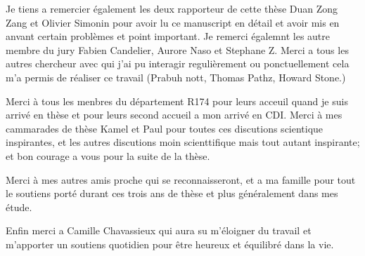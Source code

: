 Je tiens a remercier également les deux rapporteur de cette thèse Duan Zong Zang et Olivier Simonin pour avoir lu ce manuscript en détail et avoir mis en anvant certain problèmes et point important. 
Je remerci égalemnt les autre membre du jury Fabien Candelier, Aurore Naso et Stephane Z. 
Merci a tous les autres chercheur avec qui j'ai pu interagir regulièrement ou ponctuellement cela m'a permis de réaliser ce travail  (Prabuh nott,  Thomas Pathz, Howard Stone.)


Merci à tous les menbres du département R174 pour leurs acceuil quand je suis arrivé en thèse et pour leurs second accueil a mon arrivé en CDI. 
Merci à mes cammarades de thèse Kamel et Paul pour toutes ces discutions scientique inspirantes, et les autres discutions moin scienttifique mais tout autant inspirante; et bon courage a vous pour la suite de la thèse. 

Merci à mes autres amis proche qui se reconnaisseront, et a ma famille pour tout le soutiens porté durant ces trois ans de thèse et plus généralement dans mes étude. 

Enfin merci a Camille Chavassieux qui aura su m'éloigner du travail et m'apporter un soutiens quotidien pour être heureux et équilibré dans la vie.  

\newpage